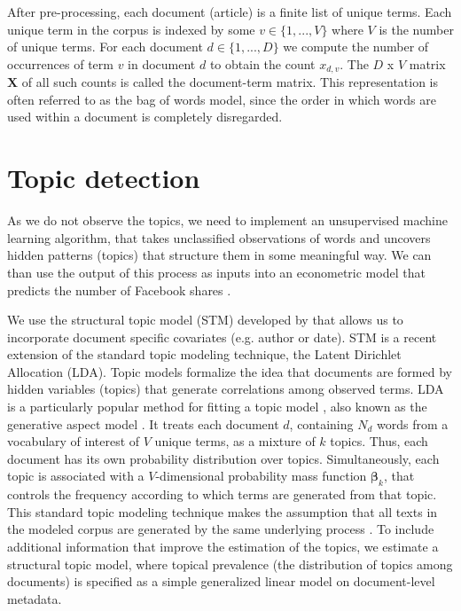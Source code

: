 \documentclass[12pt,a4paper,notitlepage]{article}
\begin{document}
After pre-processing, each document (article) is a finite list of unique terms. Each unique term in the corpus is indexed by some $v \in \lbrace 1,...,V \rbrace$ where $V$ is the number of unique terms. For each document $d \in \lbrace 1,...,D \rbrace$ we compute the number of occurrences of term $v$ in document $d$ to obtain the count $x_{d,v}$. The $D$ x $V$ matrix $\boldsymbol{X}$ of all such counts is called the document-term matrix. This representation is often referred to as the bag of words model, since the order in which words are used within a document is completely disregarded. 


\section{Topic detection}\label{ch_model}

As we do not observe the topics, we need to implement an unsupervised machine learning algorithm, that takes unclassified observations of words and uncovers hidden patterns (topics) that structure them in some meaningful way. We can than use the output of this process as inputs into an econometric model that predicts the number of Facebook shares \citep{gentzkow_text_2017}. 

We use the structural topic model (STM) developed by \citet{roberts_model_2016} that allows us to incorporate document specific covariates (e.g. author or date). STM is a recent extension of the standard topic modeling technique, the Latent Dirichlet Allocation (LDA). Topic models formalize the idea that documents are formed by hidden variables (topics) that generate correlations among observed terms. LDA is a particularly popular method for fitting a topic model \citep{blei_latent_2003}, also known as the generative aspect model \citep{minka_expectation-propagation_2002}. It treats each document $d$, containing $N_d$ words from a vocabulary of interest of $V$ unique terms, as a mixture of $k$ topics. Thus, each document has its own probability distribution over topics. Simultaneously, each topic is associated with a $V$-dimensional probability mass function $\boldsymbol{\beta}_k$, that controls the frequency according to which terms are generated from that topic. This standard topic modeling technique makes the assumption that all texts in the modeled corpus are generated by the same underlying process \citep{mishler_using_2015}. To include additional information that improve the estimation of the topics, we estimate a structural topic model, where topical prevalence (the distribution of topics among documents) is specified as a simple generalized linear model on document-level metadata. 
\end{document}
